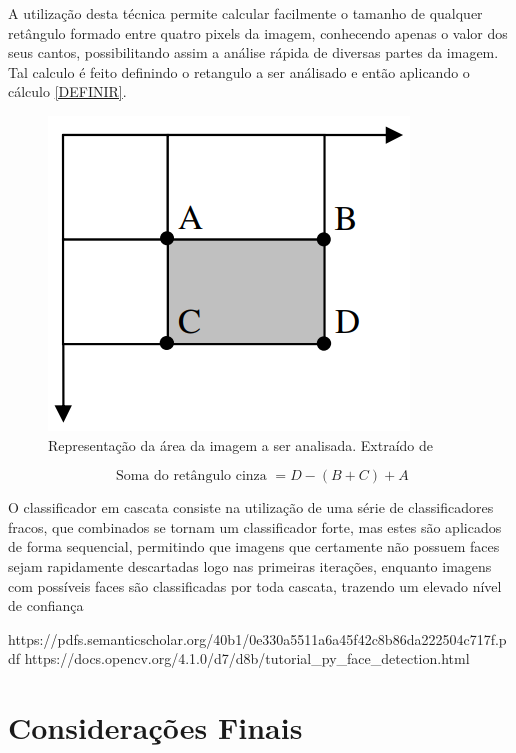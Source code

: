 A utilização desta técnica permite calcular facilmente o tamanho de qualquer retângulo formado entre quatro pixels da imagem, conhecendo apenas o valor dos seus cantos, possibilitando assim a análise rápida de diversas partes da imagem. Tal calculo é feito definindo o retangulo a ser análisado e então aplicando o cálculo \ref{DEFINIR}.

\begin{figure}[htpb]
    \centering
    \includegraphics[scale=.3]{figs/imagem-integral-calculo.png}
    \caption{Representação da área da imagem a ser analisada. Extraído de }
    \label{fig:img-integral}
 \end{figure}

 \begin{equation}\label{eq:img-integral}
    \text{ Soma do retângulo cinza } = D - (B + C) + A
\end{equation}


O classificador em cascata consiste na utilização de uma série de classificadores fracos, que combinados se tornam um classificador forte, mas estes são aplicados de forma sequencial, permitindo que imagens que certamente não possuem faces sejam rapidamente descartadas logo nas primeiras iterações, enquanto imagens com possíveis faces são classificadas por toda cascata, trazendo um elevado nível de confiança

https://pdfs.semanticscholar.org/40b1/0e330a5511a6a45f42c8b86da222504c717f.pdf
https://docs.opencv.org/4.1.0/d7/d8b/tutorial_py_face_detection.html

\section{Considerações Finais}

\lipsum[23]
